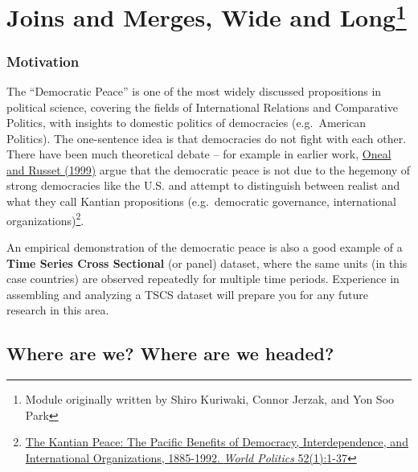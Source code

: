 \documentclass[]{book}
\newenvironment{Shaded}{\begin{snugshade}}{\end{snugshade}}
\let\rmarkdownfootnote\footnote%
\def\footnote{\protect\rmarkdownfootnote}
\theoremstyle{definition}
\theoremstyle{definition}
\theoremstyle{definition}
\theoremstyle{remark}
\begin{document}
\begin{Shaded}
\begin{Highlighting}[]
\begin{Shaded}
\begin{Highlighting}[]
\begin{Shaded}
\begin{Highlighting}[]
\hypertarget{dempeace}{%
\chapter[Joins and Merges, Wide and Long]{\texorpdfstring{Joins and Merges, Wide and Long\footnote{Module originally written by Shiro Kuriwaki, Connor Jerzak, and Yon Soo Park}}{Joins and Merges, Wide and Long}}\label{dempeace}}

\hypertarget{motivation-1}{%
\subsection*{Motivation}\label{motivation-1}}

The ``Democratic Peace'' is one of the most widely discussed propositions in political science, covering the fields of International Relations and Comparative Politics, with insights to domestic politics of democracies (e.g.~American Politics). The one-sentence idea is that democracies do not fight with each other. There have been much theoretical debate -- for example in earlier work, \href{https://blackboard.angelo.edu/bbcswebdav/institution/LFA/CSS/Course\%20Material/SEC6302/Readings/Lesson_3/Oneal-Russett.pdf}{Oneal and Russet (1999)} argue that the democratic peace is not due to the hegemony of strong democracies like the U.S. and attempt to distinguish between realist and what they call Kantian propositions (e.g.~democratic governance, international organizations)\footnote{\href{https://blackboard.angelo.edu/bbcswebdav/institution/LFA/CSS/Course\%20Material/SEC6302/Readings/Lesson_3/Oneal-Russett.pdf}{The Kantian Peace: The Pacific Benefits of Democracy, Interdependence, and International Organizations, 1885-1992. \emph{World Politics} 52(1):1-37}}.

An empirical demonstration of the democratic peace is also a good example of a \textbf{Time Series Cross Sectional} (or panel) dataset, where the same units (in this case countries) are observed repeatedly for multiple time periods. Experience in assembling and analyzing a TSCS dataset will prepare you for any future research in this area.

\hypertarget{where-are-we-where-are-we-headed-4}{%
\section*{Where are we? Where are we headed?}\label{where-are-we-where-are-we-headed-4}}


\end{Highlighting}
\end{Shaded}
\end{Highlighting}
\end{Shaded}
\end{Highlighting}
\end{Shaded}
\end{document}
